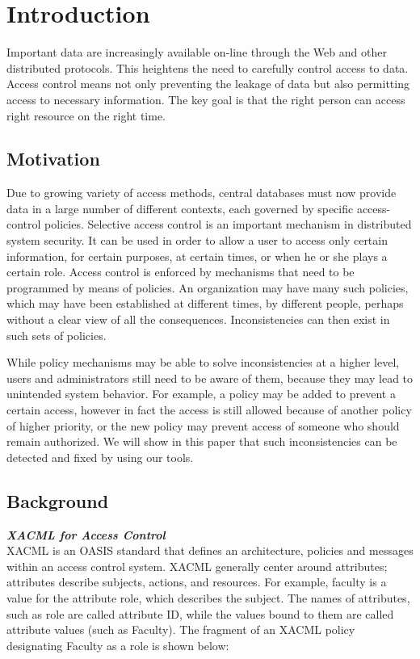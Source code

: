 \documentclass{acm_proc_article-sp}
\begin{document}
\section{Introduction}

Important data are increasingly available on-line through the Web and other distributed protocols. This heightens the need to carefully control access to data. Access control means not only preventing the leakage of data but also permitting access to necessary information. The key goal is that the right person can access right resource on the right time.

\subsection{Motivation}

Due to growing variety of access methods, central databases must now provide data in a
large number of different contexts, each governed by specific access-control policies. Selective access control is an important mechanism in distributed system security. It can be used in order to allow a user to access only certain information, for certain purposes, at certain times, or when he or she plays a certain role. Access control is enforced by mechanisms that need to be programmed by means of policies. An organization may have many such policies, which may have been established at different times, by different people, perhaps without a clear view of all the consequences. Inconsistencies can then exist in such sets of policies. 

While policy mechanisms may be able to solve inconsistencies at a higher level, users and administrators still need to be aware of them, because they may lead to unintended system behavior. For example, a policy may be added to prevent a certain access, however in fact the access is still allowed because of another policy of higher priority, or the new policy may prevent access of someone who should remain authorized. We will show in this paper that such inconsistencies can be detected and fixed by using our tools.

\subsection{Background}

\textbf{\emph{XACML for Access Control}}\\
XACML is an OASIS standard \cite{oasis:xacml} that defines an architecture, policies and messages within an access control system. XACML generally center around attributes; attributes describe subjects, actions, and resources. For example, faculty is a value for the attribute role, which describes the subject. The names of attributes, such as role are called attribute ID, while the values bound
to them are called attribute values  (such as Faculty). The fragment of an XACML policy designating Faculty as a role is shown below:\\
\end{document}
